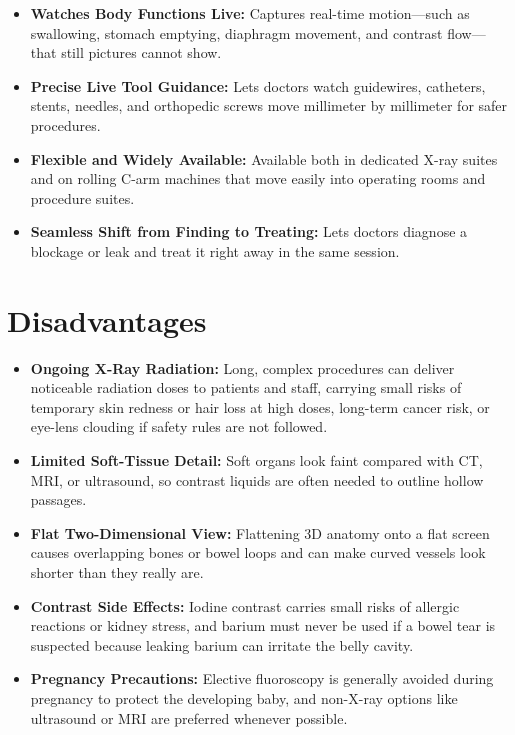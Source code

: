 \begin{itemize}
    \item \textbf{Watches Body Functions Live:} Captures real-time motion---such as swallowing, stomach emptying, diaphragm movement, and contrast flow---that still pictures cannot show.
    \item \textbf{Precise Live Tool Guidance:} Lets doctors watch guidewires, catheters, stents, needles, and orthopedic screws move millimeter by millimeter for safer procedures.
    \item \textbf{Flexible and Widely Available:} Available both in dedicated X-ray suites and on rolling C-arm machines that move easily into operating rooms and procedure suites.
    \item \textbf{Seamless Shift from Finding to Treating:} Lets doctors diagnose a blockage or leak and treat it right away in the same session.
\end{itemize}

\section{Disadvantages}

\begin{itemize}
    \item \textbf{Ongoing X-Ray Radiation:} Long, complex procedures can deliver noticeable radiation doses to patients and staff, carrying small risks of temporary skin redness or hair loss at high doses, long-term cancer risk, or eye-lens clouding if safety rules are not followed.
    \item \textbf{Limited Soft-Tissue Detail:} Soft organs look faint compared with CT, MRI, or ultrasound, so contrast liquids are often needed to outline hollow passages.
    \item \textbf{Flat Two-Dimensional View:} Flattening 3D anatomy onto a flat screen causes overlapping bones or bowel loops and can make curved vessels look shorter than they really are.
    \item \textbf{Contrast Side Effects:} Iodine contrast carries small risks of allergic reactions or kidney stress, and barium must never be used if a bowel tear is suspected because leaking barium can irritate the belly cavity.
    \item \textbf{Pregnancy Precautions:} Elective fluoroscopy is generally avoided during pregnancy to protect the developing baby, and non-X-ray options like ultrasound or MRI are preferred whenever possible.
\end{itemize}

